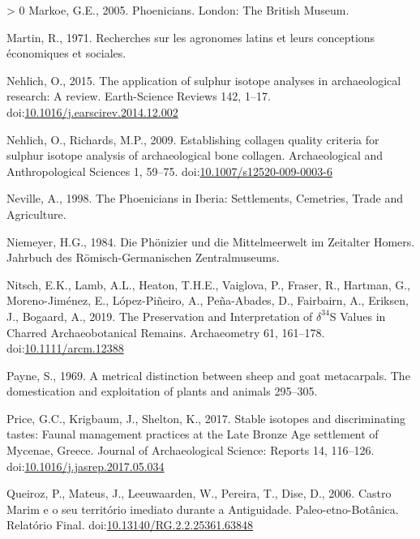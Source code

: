 \documentclass[3p]{elsarticle} %
\newlength{\cslhangindent}
\newenvironment{CSLReferences}[3] %
 {%
  \setlength{\parindent}{0pt}
  \ifodd #1 \everypar{\setlength{\hangindent}{\cslhangindent}}\ignorespaces\fi
  \ifnum #2 > 0
  \setlength{\parskip}{#2\baselineskip}
  \fi
 }%
 {}
\begin{document}
\begin{CSLReferences}{1}{0}
\leavevmode\hypertarget{ref-markoe05}{}%
Markoe, G.E., 2005. Phoenicians. {London}: {The British Museum}.

\leavevmode\hypertarget{ref-martin71}{}%
Martin, R., 1971. Recherches sur les agronomes latins et leurs conceptions économiques et sociales.

\leavevmode\hypertarget{ref-nehlich15}{}%
Nehlich, O., 2015. The application of sulphur isotope analyses in archaeological research: {A} review. Earth-Science Reviews 142, 1--17. doi:\href{https://doi.org/10.1016/j.earscirev.2014.12.002}{10.1016/j.earscirev.2014.12.002}

\leavevmode\hypertarget{ref-nehlich_richards09}{}%
Nehlich, O., Richards, M.P., 2009. Establishing collagen quality criteria for sulphur isotope analysis of archaeological bone collagen. Archaeological and Anthropological Sciences 1, 59--75. doi:\href{https://doi.org/10.1007/s12520-009-0003-6}{10.1007/s12520-009-0003-6}

\leavevmode\hypertarget{ref-neville98}{}%
Neville, A., 1998. The {Phoenicians} in {Iberia}: {Settlements}, {Cemetries}, {Trade} and {Agriculture}.

\leavevmode\hypertarget{ref-niemeyer84}{}%
Niemeyer, H.G., 1984. Die {Phönizier} und die {Mittelmeerwelt} im {Zeitalter Homers}. {Jahrbuch des Römisch-Germanischen Zentralmuseums}.

\leavevmode\hypertarget{ref-nitsch_etal19}{}%
Nitsch, E.K., Lamb, A.L., Heaton, T.H.E., Vaiglova, P., Fraser, R., Hartman, G., Moreno-Jiménez, E., López-Piñeiro, A., Peña-Abades, D., Fairbairn, A., Eriksen, J., Bogaard, A., 2019. The {Preservation} and {Interpretation} of {\(\delta^{34}\)S Values} in {Charred Archaeobotanical Remains}. Archaeometry 61, 161--178. doi:\href{https://doi.org/10.1111/arcm.12388}{10.1111/arcm.12388}

\leavevmode\hypertarget{ref-payne69}{}%
Payne, S., 1969. A metrical distinction between sheep and goat metacarpals. The domestication and exploitation of plants and animals 295--305.

\leavevmode\hypertarget{ref-price_etal17}{}%
Price, G.C., Krigbaum, J., Shelton, K., 2017. Stable isotopes and discriminating tastes: {Faunal} management practices at the {Late Bronze Age} settlement of {Mycenae}, {Greece}. Journal of Archaeological Science: Reports 14, 116--126. doi:\href{https://doi.org/10.1016/j.jasrep.2017.05.034}{10.1016/j.jasrep.2017.05.034}

\leavevmode\hypertarget{ref-queiroz_etal06}{}%
Queiroz, P., Mateus, J., Leeuwaarden, W., Pereira, T., Dise, D., 2006. Castro {Marim} e o seu território imediato durante a {Antiguidade}. {Paleo}-etno-{Botânica}. {Relatório Final}. doi:\href{https://doi.org/10.13140/RG.2.2.25361.63848}{10.13140/RG.2.2.25361.63848}


\end{CSLReferences}
\end{document}
